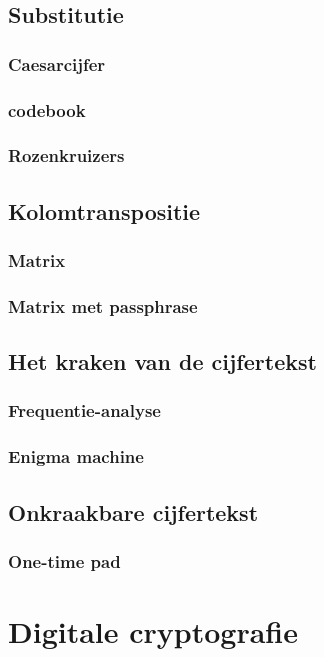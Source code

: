 \documentclass[a4paper,12pt,twoside,openright,titlepage]{book}
\begin{document}
\section{Substitutie}

\subsection{Caesarcijfer}

\subsection{codebook}

\subsection{Rozenkruizers}

\section{Kolomtranspositie}
\subsection{Matrix}

\subsection{Matrix met passphrase}

\section{Het kraken van de cijfertekst}
\subsection{Frequentie-analyse}

\subsection{Enigma machine}

\section{Onkraakbare cijfertekst}
\subsection{One-time pad}


\chapter{Digitale cryptografie}
\end{document}
